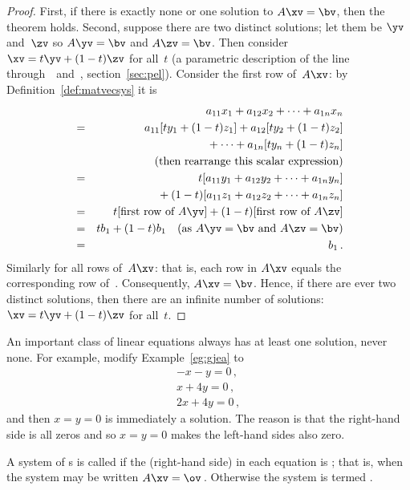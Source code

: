 \begin{proof} 
First, if there is exactly none or one solution to \(A\xv=\bv\), then the theorem holds. 
Second, suppose there are two distinct solutions; let them be \(\yv\) and~\(\zv\) so \(A\yv=\bv\) and \(A\zv=\bv\).  
Then consider \(\xv=t\yv+(1-t)\zv\) for all~\(t\) (a parametric description of the line through~\yv\ and~\zv, section~\ref{sec:pel}). 
Consider the first row of~\(A\xv\): by Definition~\ref{def:matvecsys} it is
\begin{eqnarray*}&&
a_{11}x_1+a_{12}x_2+\cdots+a_{1n}x_n
\\&=&a_{11}[ty_1+(1-t)z_1]+a_{12}[ty_2+(1-t)z_2]
\\&&{}
+\cdots+a_{1n}[ty_n+(1-t)z_n]
\\&&\quad(\text{then rearrange this scalar expression})
\\&=&t[a_{11}y_1+a_{12}y_2+\cdots+a_{1n}y_n]
\\&&{}
+(1-t)[a_{11}z_1+a_{12}z_2+\cdots+a_{1n}z_n]
\\&=&t[\text{first row of }A\yv]
+(1-t)[\text{first row of }A\zv]
\\&=&tb_1+(1-t)b_1 \quad(\text{as }A\yv=\bv\text{ and }A\zv=\bv)
\\&=&b_1\,.
\end{eqnarray*}
Similarly for all rows of~\(A\xv\): that is, each row in \(A\xv\) equals the corresponding row of~\bv.
Consequently, \(A\xv=\bv\). 
Hence, if there are ever two distinct solutions, then there are an infinite number of solutions: \(\xv=t\yv+(1-t)\zv\) for all~\(t\).
\end{proof}




An important class of linear equations always has at least one solution, never none.
For example, modify Example~\ref{eg:gjea} to 
\begin{equation*}
\begin{array}{l}
-x-y=0\,,\\x+4y=0\,,\\2x+4y=0\,,
\end{array}
\end{equation*}
and then \(x=y=0\) is immediately a solution.  
The reason is that the right-hand side is all zeros and so \(x=y=0\) makes the left-hand sides also zero.

\begin{definition} \label{def:homosys} 
A system of s is called  if the (right-hand side)  in each equation is ; that is, when the system may be written \(A\xv=\ov\)\,.
Otherwise the system is termed .
\end{definition}

